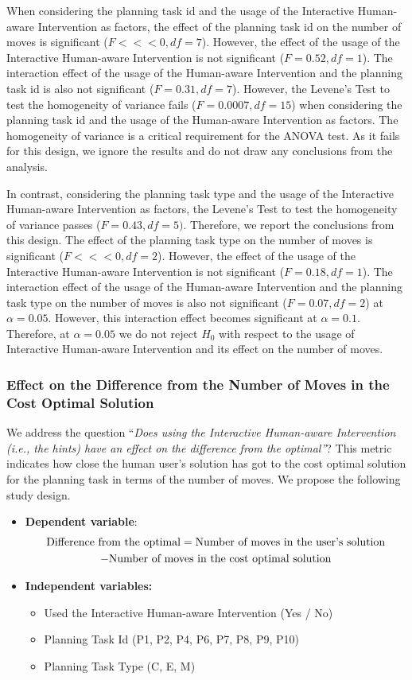 When considering the planning task id and the usage of the Interactive Human-aware Intervention as factors, the effect of the planning task id on the number of moves is significant ($F<<<0, df=7$).
However, the effect of the usage of the Interactive Human-aware Intervention is not significant ($F=0.52, df=1$).
The interaction effect of the usage of the Human-aware Intervention and the planning task id is also not significant ($F=0.31, df=7$).
However, the Levene's Test to test the homogeneity of variance fails ($F=0.0007, df=15$) when considering the planning task id and the usage of the Human-aware Intervention as factors.
The homogeneity of variance is a critical requirement for the ANOVA test.
As it fails for this design, we ignore the results and do not draw any conclusions from the analysis.

In contrast, considering the planning task type and the usage of the Interactive Human-aware Intervention as factors, the Levene's Test to test the homogeneity of variance passes ($F=0.43, df=5)$.
Therefore, we report the conclusions from this design.
The effect of the planning task type on the number of moves is significant ($F<<<0, df=2$).
However, the effect of the usage of the Interactive Human-aware Intervention is not significant ($F=0.18, df=1$).
The interaction effect of the usage of the Human-aware Intervention and the planning task type on the number of moves is also not significant ($F=0.07, df=2$) at $\alpha=0.05$.
However, this interaction effect becomes significant at $\alpha=0.1$.
Therefore, at $\alpha=0.05$ we do not reject $H_0$ with respect to the usage of Interactive Human-aware Intervention and its effect on the number of moves.


\subsubsection{Effect on the Difference from the Number of Moves in the Cost Optimal Solution}
We address the question ``\textit{Does using the Interactive Human-aware Intervention (i.e., the hints) have an effect on the difference from the optimal''}?
This metric indicates how close the human user's solution has got to the cost optimal solution for the planning task in terms of the number of moves.
We propose the following study design.
\begin{itemize}
\item \textbf{Dependent variable}: 
\begin{multline}
\textup{Difference from the optimal} = \textup{Number of  moves in the user's solution}\\ - \textup{Number of moves in the cost optimal solution}
\end{multline}
\item \textbf{Independent variables:}
\begin{itemize}
\item Used the Interactive Human-aware Intervention (Yes / No)
\item Planning Task Id (P1, P2, P4, P6, P7, P8, P9, P10)
\item Planning Task Type (C, E, M)
\end{itemize}
\end{itemize}

